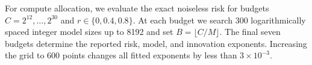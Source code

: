 For compute allocation, we evaluate the exact noiseless risk for budgets
$C=2^{12},\ldots,2^{30}$ and $r\in\{0,0.4,0.8\}$.  At each budget we search 300
logarithmically spaced integer model sizes up to 8192 and set
$B=\lfloor C/M\rfloor$.  The final seven budgets determine the reported risk,
model, and innovation exponents.  Increasing the grid to 600 points changes
all fitted exponents by less than $3\times10^{-3}$.
